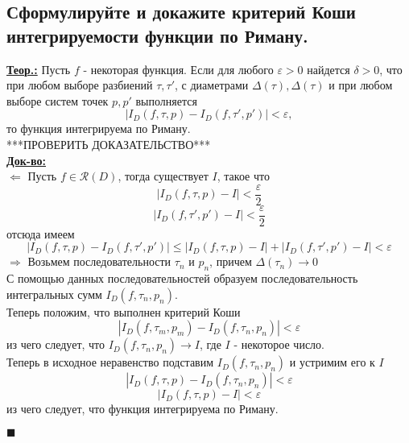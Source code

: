 
\subsection{Сформулируйте и докажите критерий Коши интегрируемости функции по Риману.}

\textbf{\underline{Теор.:} } Пусть $f$ - некоторая функция. Если для любого $\varepsilon > 0$ найдется $\delta > 0$, что при любом выборе разбиений $\tau, \tau'$, с диаметрами $\Delta(\tau), \Delta(\tau)$ и при любом выборе систем точек $p, p'$ выполняется 
\[|I_D(f, \tau, p) - I_D(f, \tau', p')| < \varepsilon,\]
то функция интегрируема по Риману.\\
***ПРОВЕРИТЬ ДОКАЗАТЕЛЬСТВО*** \\
\textbf{\underline{Док-во:} } \\
$\Leftarrow$ Пусть $f \in \mathcal{R}(D)$, тогда существует $I$, такое что 
\[|I_D(f, \tau, p) - I| < \frac{\varepsilon}{2}\]
\[|I_D(f, \tau', p') - I| < \frac{\varepsilon}{2}\]
отсюда имеем
\[|I_D(f, \tau, p) - I_D(f, \tau', p')| \leq |I_D(f, \tau, p) - I| + |I_D(f, \tau', p') - I| < \varepsilon\]
$\Rightarrow$ Возьмем последовательности $\tau_n$ и $p_n$, причем $\Delta(\tau_n) \rightarrow 0$ \\
С помощью данных последовательностей образуем последовательность интегральных сумм $I_D(f, \tau_n, p_n)$. \\
Теперь положим, что выполнен критерий Коши
\[|I_D(f, \tau_m, p_m) - I_D(f, \tau_n, p_n)| < \varepsilon\]
из чего следует, что $I_D(f, \tau_n, p_n) \rightarrow I$, где $I$ - некоторое число. \\
Теперь в исходное неравенство подставим $I_D(f, \tau_n, p_n)$ и устримим его к $I$
\[|I_D(f, \tau, p) - I_D(f, \tau_n, p_n)| < \varepsilon\]
\[|I_D(f, \tau, p) - I| < \varepsilon\] 
из чего следует, что функция интегрируема по Риману.
\begin{flushright}
$\blacksquare$
\end{flushright}



